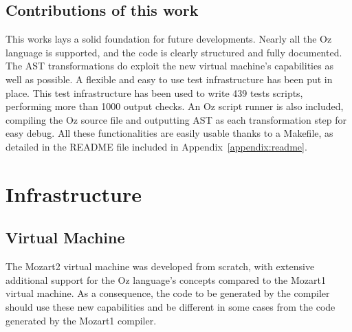 \documentclass[a4paper]{memoir}
\begin{document}
\section{Contributions of this work}
This works lays a solid foundation for future developments.
Nearly all the Oz language is supported, and the code is clearly structured and fully documented.
The AST transformations do exploit the new virtual machine's capabilities as well as possible.
A flexible and easy to use test infrastructure has been put in place. This test infrastructure has been used
to write 439 tests scripts, performing more than 1000 output checks.
An Oz script runner is also included, compiling the Oz source file and outputting AST as each transformation step for easy debug.
All these functionalities are easily usable thanks to a Makefile, as detailed in the README file included in Appendix~\ref{appendix:readme}. 

\chapter{Infrastructure}
\section{Virtual Machine}
The Mozart2 virtual machine was developed from scratch, with extensive additional support for the Oz language's concepts compared to the Mozart1 virtual machine. As a consequence, the code to be generated by the compiler should use these new capabilities and be different in some cases from the code generated by the Mozart1 compiler.
\end{document}
